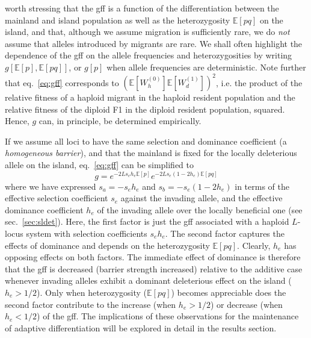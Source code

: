 \documentclass[
  11pt,
]{article}
\begin{document}
worth stressing that the gff is a function of the differentiation
between the mainland and island population as well as the heterozygosity
\(\mathbb{E}[pq]\) on the island, and that, although we assume migration
is sufficiently rare, we do \emph{not} assume that alleles introduced by
migrants are rare. We shall often highlight the dependence of the gff on
the allele frequencies and heterozygosities by writing
\(g[\mathbb{E}[p], \mathbb{E}[pq]]\), or \(g[p]\) when allele
frequencies are deterministic. Note further that eq.~\ref{eq:gff}
corresponds to \((\mathbb{E}[W_h^{(0)}]\mathbb{E}[W_d^{(1)}])^2\), i.e.
the product of the relative fitness of a haploid migrant in the haploid
resident population and the relative fitness of the diploid F1 in the
diploid resident population, squared. Hence, \(g\) can, in principle, be
determined empirically.

If we assume all loci to have the same selection and dominance
coefficient (a \emph{homogeneous barrier}), and that the mainland is
fixed for the locally deleterious allele on the island, eq.~\ref{eq:gff}
can be simplified to \begin{equation}
  g = e^{-2Ls_eh_e\mathbb{E}[p]}e^{-2Ls_e(1-2h_e)\mathbb{E}[pq]}
  \label{eq:eqeff2}
\end{equation} where we have expressed \(s_a = -s_eh_e\) and
\(s_b = -s_e(1-2h_e)\) in terms of the effective selection coefficient
\(s_e\) against the invading allele, and the effective dominance
coefficient \(h_e\) of the invading allele over the locally beneficial
one (see sec.~\ref{sec:sldet}). Here, the first factor is just the gff
associated with a haploid \(L\)-locus system with selection coefficients
\(s_eh_e\). The second factor captures the effects of dominance and
depends on the heterozygosity \(\mathbb{E}[pq]\). Clearly, \(h_e\) has
opposing effects on both factors. The immediate effect of dominance is
therefore that the gff is decreased (barrier strength increased)
relative to the additive case whenever invading alleles exhibit a
dominant deleterious effect on the island (\(h_e > 1/2\)). Only when
heterozygosity (\(\mathbb{E}[pq]\)) becomes appreciable does the second
factor contribute to the increase (when \(h_e > 1/2\)) or decrease (when
\(h_e < 1/2\)) of the gff. The implications of these observations for
the maintenance of adaptive differentiation will be explored in detail
in the results section.
\end{document}
